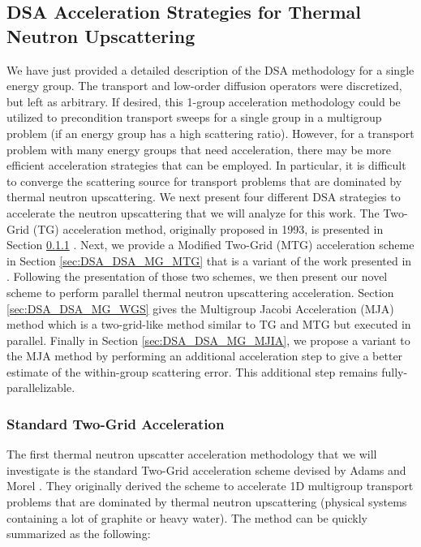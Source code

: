 \subsection{DSA Acceleration Strategies for Thermal Neutron Upscattering}
\label{sec::DSA_DSA_MG}

We have just provided a detailed description of the DSA methodology for a single energy group. The transport and low-order diffusion operators were discretized, but left as arbitrary. If desired, this 1-group acceleration methodology could be utilized to precondition transport sweeps for a single group in a multigroup problem (if an energy group has a high scattering ratio). However, for a transport problem with many energy groups that need acceleration, there may be more efficient acceleration strategies that can be employed. In particular, it is difficult to converge the scattering source for transport problems that are dominated by thermal neutron upscattering. We next present four different DSA strategies to accelerate the neutron upscattering that we will analyze for this work. The Two-Grid (TG) acceleration method, originally proposed in 1993, is presented in Section \ref{sec:DSA_DSA_MG_TG} \cite{adams1993two}. Next, we provide a Modified Two-Grid (MTG) acceleration scheme in Section \ref{sec:DSA_DSA_MG_MTG} that is a variant of the work presented in \cite{evans2010transport}. Following the presentation of those two schemes, we then present our novel scheme to perform parallel thermal neutron upscattering acceleration. Section \ref{sec:DSA_DSA_MG_WGS} gives the Multigroup Jacobi Acceleration (MJA) method which is a two-grid-like method similar to TG and MTG but executed in parallel. Finally in Section \ref{sec:DSA_DSA_MG_MJIA}, we propose a variant to the MJA method by performing an additional acceleration step to give a better estimate of the within-group scattering error. This additional step remains fully-parallelizable.

\subsubsection{Standard Two-Grid Acceleration}
\label{sec:DSA_DSA_MG_TG}

The first thermal neutron upscatter acceleration methodology that we will investigate is the standard Two-Grid acceleration scheme devised by Adams and Morel \cite{adams1993two}. They originally derived the scheme to accelerate 1D multigroup transport problems that are dominated by thermal neutron upscattering (physical systems containing a lot of graphite or heavy water). The method can be quickly summarized as the following:

